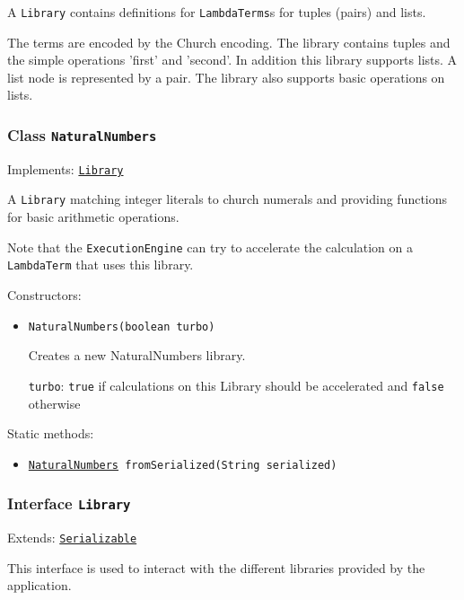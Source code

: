 A \texttt{Library} contains definitions for \texttt{LambdaTerms}s for tuples (pairs) and lists.
 
 The terms are encoded by the Church encoding. The library contains tuples and the simple 
 operations 'first' and 'second'. In addition this library supports lists. 
 A list node is represented by a pair. The library also supports basic operations on lists.

\subsubsection{Class \texttt{NaturalNumbers}}
\label{type:edu.kit.wavelength.client.model.library.NaturalNumbers}
Implements: \texttt{\hyperref[type:edu.kit.wavelength.client.model.library.Library]{Library}}

A \texttt{Library} matching integer literals to church numerals and providing
 functions for basic arithmetic operations.

 Note that the \texttt{ExecutionEngine} can try to accelerate the calculation
 on a \texttt{LambdaTerm} that uses this library.

Constructors:
\begin{itemize}
\item \texttt{NaturalNumbers(boolean turbo)}

Creates a new NaturalNumbers library.

\texttt{turbo}: \texttt{true} if calculations on this Library should be accelerated and \texttt{false} otherwise

\end{itemize}

Static methods:
\begin{itemize}
\item \texttt{\hyperref[type:edu.kit.wavelength.client.model.library.NaturalNumbers]{NaturalNumbers} fromSerialized(String serialized)}



\end{itemize}

\subsubsection{Interface \texttt{Library}}
\label{type:edu.kit.wavelength.client.model.library.Library}
Extends: \texttt{\hyperref[type:edu.kit.wavelength.client.model.serialization.Serializable]{Serializable}}

This interface is used to interact with the different libraries provided by
 the application. 
 
